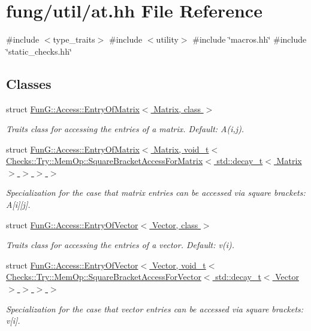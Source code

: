 \hypertarget{at_8hh}{\section{fung/util/at.hh \-File \-Reference}
\label{at_8hh}
}
{\ttfamily \#include $<$type\-\_\-traits$>$}\*
{\ttfamily \#include $<$utility$>$}\*
{\ttfamily \#include \char`\"{}macros.\-hh\char`\"{}}\*
{\ttfamily \#include \char`\"{}static\-\_\-checks.\-hh\char`\"{}}\*
\subsection*{\-Classes}
\begin{DoxyCompactItemize}
\item 
struct \hyperlink{structFunG_1_1Access_1_1EntryOfMatrix}{\-Fun\-G\-::\-Access\-::\-Entry\-Of\-Matrix$<$ Matrix, class $>$}
\begin{DoxyCompactList}\small\item\em \-Traits class for accessing the entries of a matrix. \-Default\-: \-A(i,j). \end{DoxyCompactList}\item 
struct \hyperlink{structFunG_1_1Access_1_1EntryOfMatrix_3_01Matrix_00_01void__t_3_01Checks_1_1Try_1_1MemOp_1_1Squa64f8314119f1d5e2cd3b3016365cec8d}{\-Fun\-G\-::\-Access\-::\-Entry\-Of\-Matrix$<$ Matrix, void\-\_\-t$<$ Checks\-::\-Try\-::\-Mem\-Op\-::\-Square\-Bracket\-Access\-For\-Matrix$<$ std\-::decay\-\_\-t$<$ Matrix $>$ $>$ $>$ $>$}
\begin{DoxyCompactList}\small\item\em \-Specialization for the case that matrix entries can be accessed via square brackets\-: \-A\mbox{[}i\mbox{]}\mbox{[}j\mbox{]}. \end{DoxyCompactList}\item 
struct \hyperlink{structFunG_1_1Access_1_1EntryOfVector}{\-Fun\-G\-::\-Access\-::\-Entry\-Of\-Vector$<$ Vector, class $>$}
\begin{DoxyCompactList}\small\item\em \-Traits class for accessing the entries of a vector. \-Default\-: v(i). \end{DoxyCompactList}\item 
struct \hyperlink{structFunG_1_1Access_1_1EntryOfVector_3_01Vector_00_01void__t_3_01Checks_1_1Try_1_1MemOp_1_1Squaa9733f1e90025a89b1e2cfa7d151d247}{\-Fun\-G\-::\-Access\-::\-Entry\-Of\-Vector$<$ Vector, void\-\_\-t$<$ Checks\-::\-Try\-::\-Mem\-Op\-::\-Square\-Bracket\-Access\-For\-Vector$<$ std\-::decay\-\_\-t$<$ Vector $>$ $>$ $>$ $>$}
\begin{DoxyCompactList}\small\item\em \-Specialization for the case that vector entries can be accessed via square brackets\-: v\mbox{[}i\mbox{]}. \end{DoxyCompactList}\end{DoxyCompactItemize}
